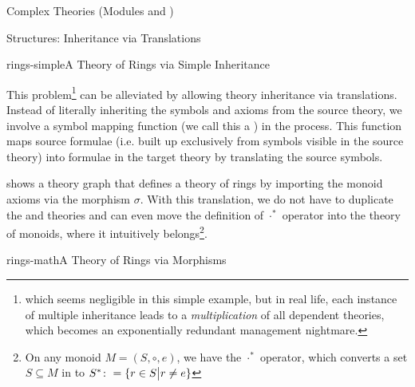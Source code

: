 \begin{tchapter}[id=complex-theories,short=Complex Theories]{Complex Theories (Modules
     and )}
\begin{tsection}[id=morphisms]{Structures: Inheritance via Translations}
\begin{myfig}{rings-simple}{A Theory of Rings via Simple Inheritance}
{}
\end{myfig}
  
This problem\footnote{which seems negligible in this simple example, but in real life,
  each instance of multiple inheritance leads to a \emph{multiplication} of all
  dependent theories, which becomes an exponentially redundant management nightmare.} can
be alleviated by allowing theory inheritance via translations.  Instead of literally
inheriting the symbols and axioms from the source theory, we involve a symbol mapping
function (we call this a ) in the process. This function maps source
formulae (i.e. built up exclusively from symbols visible in the source theory) into
formulae in the target theory by translating the source symbols.
  
 shows a theory graph that defines a theory of rings by importing
the monoid axioms via the morphism $\sigma$. With this translation, we do not have to
duplicate the  and  theories and can even move the
definition of $\cdot^*$ operator into the theory of monoids, where it intuitively
belongs\footnote{On any monoid $M=(S,\circ,e)$, we have the $\cdot^*$ operator, which
  converts a set $S\subseteq M$ in to $S^*\colon=\{r\in S\bigl|r\ne e\}$}.

\begin{myfig}{rings-math}{A Theory of Rings via Morphisms}
\end{myfig}
\end{tsection}
\end{tchapter}
